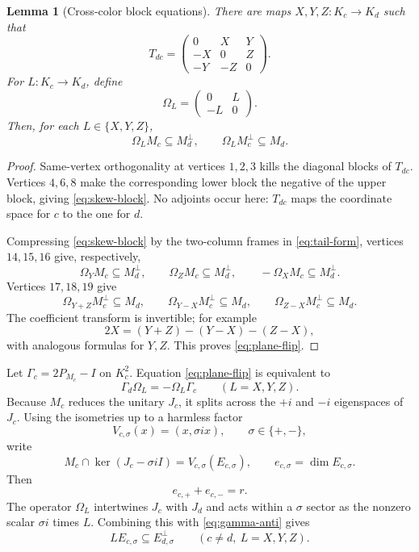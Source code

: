 \documentclass[11pt]{article}
\newtheorem{lemma}[theorem]{Lemma}
\begin{document}
\begin{lemma}[Cross-color block equations]\label{lem:cross}
There are maps $X,Y,Z:K_c\to K_d$ such that
\begin{equation}\label{eq:skew-block}
T_{dc}=\begin{pmatrix}
0&X&Y\\-X&0&Z\\-Y&-Z&0
\end{pmatrix}.
\end{equation}
For $L:K_c\to K_d$, define
\[
        \Omega_L=\begin{pmatrix}0&L\\-L&0\end{pmatrix}.
\]
Then, for each $L\in\{X,Y,Z\}$,
\begin{equation}\label{eq:plane-flip}
 \Omega_LM_c\subseteq M_d^\perp,
 \qquad
 \Omega_LM_c^\perp\subseteq M_d.
\end{equation}
\end{lemma}

\begin{proof}
Same-vertex orthogonality at vertices $1,2,3$ kills the diagonal blocks of
$T_{dc}$.  Vertices $4,6,8$ make the corresponding lower block the negative
of the upper block, giving \eqref{eq:skew-block}.  No adjoints occur here:
$T_{dc}$ maps the coordinate space for $c$ to the one for $d$.

Compressing \eqref{eq:skew-block} by the two-column frames in
\eqref{eq:tail-form}, vertices $14,15,16$ give, respectively,
\[
 \Omega_YM_c\subseteq M_d^\perp,\qquad
 \Omega_ZM_c\subseteq M_d^\perp,\qquad
 -\Omega_XM_c\subseteq M_d^\perp.
\]
Vertices $17,18,19$ give
\[
 \Omega_{Y+Z}M_c^\perp\subseteq M_d,\qquad
 \Omega_{Y-X}M_c^\perp\subseteq M_d,\qquad
 \Omega_{Z-X}M_c^\perp\subseteq M_d.
\]
The coefficient transform is invertible; for example
\[
 2X=(Y+Z)-(Y-X)-(Z-X),
\]
with analogous formulas for $Y,Z$.  This proves \eqref{eq:plane-flip}.
\end{proof}

Let $\Gamma_c=2P_{M_c}-I$ on $K_c^2$.  Equation
\eqref{eq:plane-flip} is equivalent to
\begin{equation}\label{eq:gamma-anti}
      \Gamma_d\Omega_L=-\Omega_L\Gamma_c
      \qquad(L=X,Y,Z).
\end{equation}
Because $M_c$ reduces the unitary $J_c$, it splits across the $+i$ and $-i$
eigenspaces of $J_c$.  Using the isometries up to a harmless factor
\[
       V_{c,\sigma}(x)=(x,\sigma i x),\qquad \sigma\in\{+,-\},
\]
write
\[
 M_c\cap\ker(J_c-\sigma iI)=V_{c,\sigma}(E_{c,\sigma}),
 \qquad e_{c,\sigma}=\dim E_{c,\sigma}.
\]
Then
\begin{equation}\label{eq:sector-rank}
          e_{c,+}+e_{c,-}=r.
\end{equation}
The operator $\Omega_L$ intertwines $J_c$ with $J_d$ and acts within a
$\sigma$ sector as the nonzero scalar $\sigma i$ times $L$.  Combining this
with \eqref{eq:gamma-anti} gives
\begin{equation}\label{eq:sector-map}
          L E_{c,\sigma}\subseteq E_{d,\sigma}^{\perp}
          \qquad(c\ne d,\ L=X,Y,Z).
\end{equation}
\end{document}

